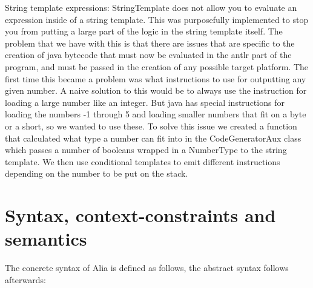 \documentclass[paper=a4, fontsize=11pt]{article}
\numberwithin{equation}{section}		%
\numberwithin{figure}{section}			%
\numberwithin{table}{section}				%
\begin{document}
String template expressions: StringTemplate does not allow you to evaluate an expression inside of a string template. This was purposefully implemented to stop you from putting a large part of the logic in the string template itself. The problem that we have with this is that there are issues that are specific to the creation of java bytecode that must now be evaluated in the antlr part of the program, and must be passed in the creation of any possible target platform. The first time this became a problem was what instructions to use for outputting any given number. A naive solution to this would be to always use the instruction for loading a large number like an integer. But java has special instructions for loading the numbers -1 through 5 and loading smaller numbers that fit on a byte or a short, so we wanted to use these. To solve this issue we created a function that calculated what type a number can fit into in the CodeGeneratorAux class which passes a number of booleans wrapped in a NumberType to the string template. We then use conditional templates to emit different instructions depending on the number to be put on the stack.




\section{Syntax, context-constraints and semantics}
The concrete syntax of Alia is defined as follows, the abstract syntax follows afterwards:
\end{document}
